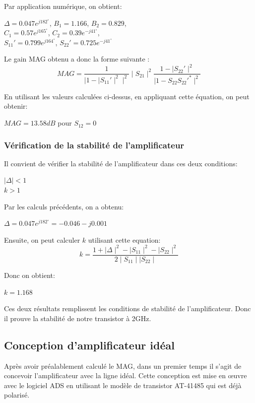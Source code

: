 \documentclass[french]{article}
\begin{document}
Par application numérique, on obtient:

{\centering
$\Delta=0.047e^{j182^{\circ}}$, $B_{1}=1.166$, $B_{2}=0.829$,\\ $C_{1}=0.57e^{j165^{\circ}}$, $C_{2}=0.39e^{-j41^{\circ}}$,\\ $S_{11}'=0.799e^{j164^{\circ}}$, $S_{22}'=0.725e^{-j41^{\circ}}$\\
}

Le gain MAG obtenu a donc la forme suivante :
\begin{equation}
	MAG=\frac{1}{\mid 1-\mid S_{11}'\mid^{2}\mid^{2}}\mid S_{21}\mid^{2}\frac{1-\mid S_{22}'\mid^{2}}{\mid 1-S_{22}S_{22}'^{\ast}\mid^{2}}
\end{equation}

En utilisant les valeurs calculées ci-dessus, en appliquant cette équation, on peut obtenir:

{\centering
	$MAG=13.58 dB$ pour $S_{12}=0$\\
}

\subsubsection{Vérification de la stabilité de l’amplificateur}
Il convient de vérifier la stabilité de l’amplificateur dans ces deux conditions:

{\centering
$\mid \Delta\mid<1$\\
$k>1$\\
}

Par les calculs précédents, on a obtenu:

{\centering
$\Delta=0.047e^{j182^{\circ}}=-0.046-j0.001$\\
}

Ensuite, on peut calculer $k$ utilisant cette equation:
\begin{equation}
	k=\frac{1+\mid \Delta\mid^{2}-\mid S_{11}\mid^{2}-\mid S_{22}\mid^{2}}{2\mid S_{11}\mid \mid S_{22}\mid}
\end{equation}

Donc on obtient:

{\centering
	$k=1.168$\\
}

Ces deux résultats remplissent les conditions de stabilité de l'amplificateur. Donc il prouve la stabilité de notre transistor à 2GHz.


\subsection{Conception d’amplificateur idéal}
Après avoir préalablement calculé le MAG, dans un premier temps il s’agit de concevoir l’amplificateur avec la ligne idéal. Cette conception est mise en œuvre avec le logiciel ADS en utilisant le modèle de transistor AT-41485 qui est déjà polarisé.
\end{document}
